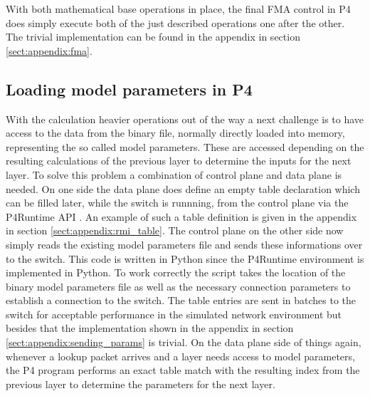 With both mathematical base operations in place, the final FMA control in P4 does simply execute both of the just described operations one after the other. The trivial implementation can be found in the appendix in section \ref{sect:appendix:fma}.

\subsection{Loading model parameters in P4}
With the calculation heavier operations out of the way a next challenge is to have access to the data from the binary file, normally directly loaded into memory, representing the so called model parameters. These are accessed depending on the resulting calculations of the previous layer to determine the inputs for the next layer. To solve this problem a combination of control plane and data plane is needed. On one side the data plane does define an empty table declaration which can be filled later, while the switch is runnning, from the control plane via the P4Runtime API \cite{p4runtime-spec}. An example of such a table definition is given in the appendix in section \ref{sect:appendix:rmi_table}. The control plane on the other side now simply reads the existing model parameters file and sends these informations over to the switch. This code is written in Python since the P4Runtime environment is implemented in Python. To work correctly the script takes the location of the binary model parameters file as well as the necessary connection parameters to establish a connection to the switch. The table entries are sent in batches to the switch for acceptable performance in the simulated network environment but besides that the implementation shown in the appendix in section \ref{sect:appendix:sending_params} is trivial. On the data plane side of things again, whenever a lookup packet arrives and a layer needs access to model parameters, the P4 program performs an exact table match with the resulting index from the previous layer to determine the parameters for the next layer.

